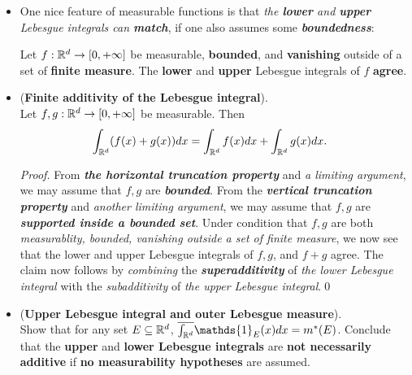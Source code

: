 \documentclass[11pt]{article}
\begin{document}
\begin{itemize}
\item One nice feature of measurable functions is that \emph{the \textbf{lower} and \textbf{upper} Lebesgue integrals can \textbf{match}}, if one also assumes some \emph{\textbf{boundedness}}:
\begin{exercise}
Let $f : {\mathbb R}^d \rightarrow [0,+\infty]$ be measurable, \textbf{bounded}, and \textbf{vanishing} outside of a set of \textbf{finite measure}. The \textbf{lower} and \textbf{upper} Lebesgue integrals of $f$ \textbf{agree}.
\end{exercise}


\item \begin{corollary}(\textbf{Finite additivity of the Lebesgue integral}).\\
 Let $f, g : {\mathbb R}^d \rightarrow [0,+\infty]$ be measurable. Then 
 \begin{align*}
 \int_{{\mathbb R}^{d}}(f(x)+g(x))dx &= \int_{{\mathbb R}^{d}}f(x)dx+ \int_{{\mathbb R}^{d}}g(x)dx.
 \end{align*}
\end{corollary}
\begin{proof} From \emph{\textbf{the horizontal truncation property}} and \emph{a limiting argument}, we may assume that $f, g$ are \emph{\textbf{bounded}}. From the \emph{\textbf{vertical truncation property}} and \emph{another limiting argument}, we may assume that $f, g$ are \emph{\textbf{supported inside a bounded set}}. Under condition that $f,g$ are both \emph{measurablity, bounded, vanishing outside a set of finite measure}, we now see that the lower and upper Lebesgue integrals of $f, g$, and $f +g$ agree. The claim now follows by \emph{combining} the \emph{\textbf{superadditivity}} of \emph{the lower Lebesgue integral} with the \emph{subadditivity} of \emph{the upper Lebesgue integral}.\qed
\end{proof}

\item \begin{exercise} (\textbf{Upper Lebesgue integral and outer Lebesgue measure}). \\
Show that for any set $E \subseteq {\mathbb R}^d$, $\overline{\int_{\bR^d}}\mathds{1}_E(x) dx = m^{*}(E)$. Conclude that the \textbf{upper} and \textbf{lower Lebesgue integrals} are \textbf{not necessarily additive} if \textbf{no measurability hypotheses} are assumed.
\end{exercise}


\end{itemize}
\end{document}
